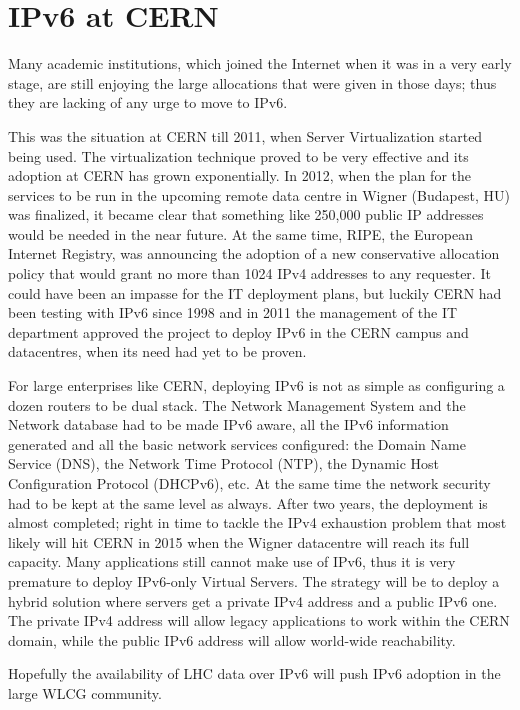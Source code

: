 \section{IPv6 at CERN}
Many academic institutions, which joined the Internet when it was in a very early stage, are still enjoying the large allocations that were given in those days; thus they are lacking of any urge to move to IPv6.
\par 
This was the situation at CERN till 2011, when Server Virtualization started being used. The virtualization technique proved to be very effective and its adoption at CERN has grown exponentially. In 2012, when the plan for the services to be run in the upcoming remote data centre in Wigner (Budapest, HU) was finalized, it became clear that something like 250,000 public IP addresses would be needed in the near future. At the same time, RIPE, the European Internet Registry, was announcing the adoption of a new conservative allocation policy that would grant no more than 1024 IPv4 addresses to any requester. 
It could have been an impasse for the IT deployment plans, but luckily CERN had been testing with IPv6 since 1998 and in 2011 the management of the IT department approved the project to deploy IPv6 in the CERN campus and datacentres, when its need had yet to be proven.
\par
For large enterprises like CERN, deploying IPv6 is not as simple as configuring a dozen routers to be dual stack. The Network Management System and the Network database had to be made IPv6 aware, all the IPv6 information generated and all the basic network services configured: the Domain Name Service (DNS), the Network Time Protocol (NTP), the Dynamic Host Configuration Protocol (DHCPv6), etc. 
At the same time the network security had to be kept at the same level as always.
After two years, the deployment is almost completed; right in time to tackle the IPv4 exhaustion problem that most likely will hit CERN in 2015 when the Wigner datacentre will reach its full capacity. 
Many applications still cannot make use of IPv6, thus it is very premature to deploy IPv6-only Virtual Servers. The strategy will be to deploy a hybrid solution where servers get a private IPv4 address and a public IPv6 one. The private IPv4 address will allow legacy applications to work within the CERN domain,  while the public IPv6 address will allow world-wide reachability.
\par
Hopefully the availability of LHC data over IPv6 will push IPv6 adoption in the large WLCG community.
